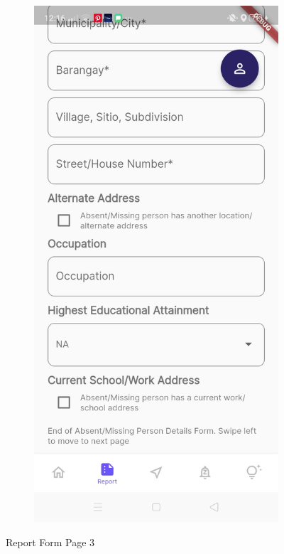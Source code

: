\begin{figure}[!h]
\begin{subfigure}[c]{0.30\linewidth}
    \end{subfigure}
    \centering
    \begin{subfigure}[c]{0.30\linewidth}
        \centering
        \includegraphics[scale=0.15]{figures/Chapter4/Main/p3-5.jpg}
    \end{subfigure}
    \caption{Report Form Page 3}
    \label{fig:ReportPage3}
\end{figure}



